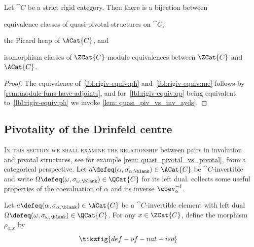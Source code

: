 \begin{theorem}\label{thm: equivalence_in_the_rigid_setting}
  Let \(\cat{C}\) be a strict rigid category.
  Then there is a bijection between
  \begin{thmlist}[noitemsep]
    \item\label{lbl:rigiv-equiv:qp} equivalence classes of quasi-pivotal structures on \(\cat{C}\),
    \item\label{lbl:rigiv-equiv:ph} the Picard heap of \(\ACat{C}\), and
    \item\label{lbl:rigiv-equiv:me} isomorphism classes of \(\ZCat{C}\)\hyp{}module equivalences between \(\ZCat{C}\) and \(\ACat{C}\).
  \end{thmlist}
\end{theorem}
\begin{proof}
  The equivalence of~\ref{lbl:rigiv-equiv:ph} and~\ref{lbl:rigiv-equiv:me} follows by \cref{rem:module-funs-have-adjoints},
  and for~\ref{lbl:rigiv-equiv:qp} being equivalent to~\ref{lbl:rigiv-equiv:ph} we invoke \cref{lem: quasi_piv_vs_inv_ayds}.
\end{proof}

\subsection{Pivotality of the Drinfeld centre}\label{subsec: piv_of_centre}

\textsc{In this section we shall examine the relationship} between pairs in involution and pivotal structures,
see for example \cref{rem: quasi_pivotal_vs_pivotal}, from a categorical perspective.
Let \(a \defeq (\alpha, \sigma_{\alpha, \blank}) \in \ACat{C}\) be \(\cat{C}\)\hyp{}invertible
and write \(\Omega \defeq (\omega, \sigma_{\omega, \blank}) \in \QCat{C}\) for its left dual.
 collects some useful properties of the coevaluation of \(\alpha\)
and its inverse \(\coev^{-\ell}_{\alpha}\).
\begin{figure}[htbp]
  \centering%
  \vspace{-\onelineskip}%
\end{figure}%

\begin{definition}\label{def:swirlyiso}
  Let \(a \defeq (\alpha, \sigma_{\alpha, \blank}) \in \ACat{C}\) be a \(\cat{C}\)\hyp{}invertible element with left dual \(\Omega \defeq (\omega, \sigma_{\omega, \blank}) \in \QCat{C}\).
  For any \(x \in \ZCat{C}\),
  define the morphism \(\rho_{a,x}\) by
  \[
    \tikzfig{def-of-nat-iso}
  \]
\end{definition}

